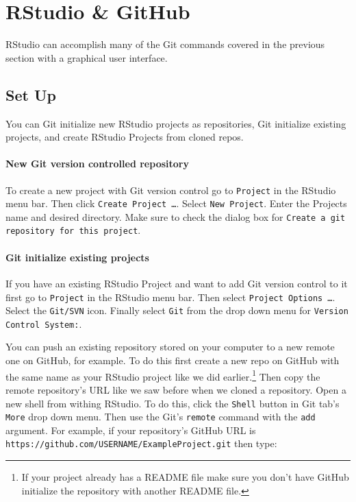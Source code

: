 \section{RStudio \& GitHub}

RStudio can accomplish many of the Git commands covered in the previous section with a graphical user interface. 

\subsection{Set Up}

You can Git initialize new RStudio projects as repositories, Git initialize existing projects, and create RStudio Projects from cloned repos. 

\paragraph{New Git version controlled repository}
To create a new project with Git version control go to \texttt{Project} in the RStudio menu bar. Then click \texttt{Create Project \ldots}. Select \texttt{New Project}. Enter the Projects name and desired directory. Make sure to check the dialog box for \texttt{Create a git repository for this project}. 

\paragraph{Git initialize existing projects}

If you have an existing RStudio Project and want to add Git version control to it first go to \texttt{Project} in the RStudio menu bar. Then select \texttt{Project Options \ldots}. Select the \texttt{Git/SVN} icon. Finally select \texttt{Git} from the drop down menu for \texttt{Version Control System:}.

You can push an existing repository stored on your computer to a new remote one on GitHub, for example. To do this first create a new repo on GitHub with the same name as your RStudio project like we did earlier.\footnote{If your project already has a README file make sure you don't have GitHub initialize the repository with another README file.} Then copy the remote repository's URL like we saw before when we cloned a repository. Open a new shell from withing RStudio. To do this, click the \texttt{Shell} button in Git tab's \texttt{More} drop down menu. Then use the Git's \texttt{remote} command with the \texttt{add} argument. For example, if your repository's GitHub URL is \texttt{https://github.com/USERNAME/ExampleProject.git} then type:


